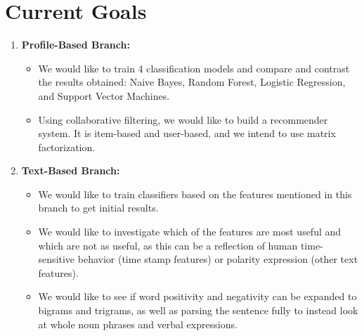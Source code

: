 \documentclass[12pt]{article}
\begin{document}
\section*{Current Goals}
\begin{enumerate}
\item 
\textbf{Profile-Based Branch:}

\begin{itemize}
\item 
We would like to train 4 classification models and compare and contrast the results obtained: Naive Bayes, Random Forest, Logistic Regression, and Support Vector Machines.

\item 
Using collaborative filtering, we would like to build a recommender system. It is item-based and user-based, and we intend to use matrix factorization.

\end{itemize}

\item 
\textbf{Text-Based Branch:}
\begin{itemize}
\item We would like to train classifiers based on the features mentioned in this branch to get initial results.

\item We would like to investigate which of the features are most useful and which are not as useful, as this can be a reflection of human time-sensitive behavior (time stamp features) or polarity expression (other text features).

\item We would like to see if word positivity and negativity can be expanded to bigrams and trigrams, as well as parsing the sentence fully to instead look at whole noun phrases and verbal expressions.
\end{itemize}


\end{enumerate}
\end{document}
